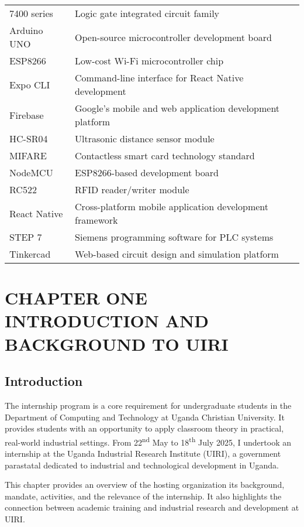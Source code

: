 \documentclass[12pt,a4paper]{report}
\begin{document}
\begin{tabular}{ll}
7400 series & Logic gate integrated circuit family \\
Arduino UNO & Open-source microcontroller development board \\
ESP8266 & Low-cost Wi-Fi microcontroller chip \\
Expo CLI & Command-line interface for React Native development \\
Firebase & Google's mobile and web application development platform \\
HC-SR04 & Ultrasonic distance sensor module \\
MIFARE & Contactless smart card technology standard \\
NodeMCU & ESP8266-based development board \\
RC522 & RFID reader/writer module \\
React Native & Cross-platform mobile application development framework \\
STEP 7 & Siemens programming software for PLC systems \\
Tinkercad & Web-based circuit design and simulation platform \\
\end{tabular}

\newpage


\chapter[CHAPTER ONE INTRODUCTION AND BACKGROUND TO UIRI]{CHAPTER ONE \\INTRODUCTION AND BACKGROUND TO UIRI}

\section{Introduction}
\noindent The internship program is a core requirement for undergraduate students in the Department of Computing and Technology at Uganda Christian University. It provides students with an opportunity to apply classroom theory in practical, real-world industrial settings. From 22\textsuperscript{nd} May to 18\textsuperscript{th} July 2025, I undertook an internship at the Uganda Industrial Research Institute (UIRI), a government parastatal dedicated to industrial and technological development in Uganda.

\noindent This chapter provides an overview of the hosting organization its background, mandate, activities, and the relevance of the internship. It also highlights the connection between academic training and industrial research and development at UIRI.
\end{document}
